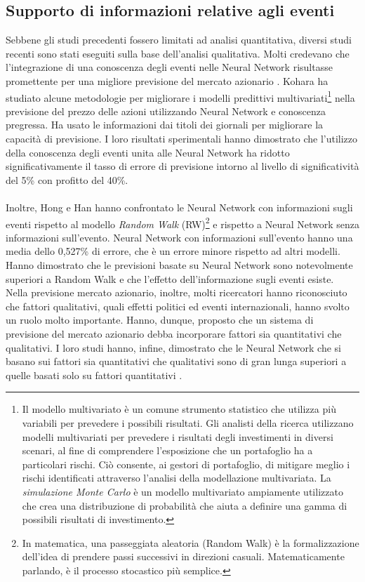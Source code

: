 \documentclass[a4paper,12pt]{report}
\begin{document}
\subsection{Supporto di informazioni relative agli eventi}
Sebbene gli studi precedenti fossero limitati ad analisi quantitativa, diversi studi recenti sono stati eseguiti sulla base dell'analisi qualitativa. Molti credevano che l'integrazione di una conoscenza degli eventi nelle Neural Network risultasse promettente per una migliore previsione del mercato azionario \cite{know-nn}\cite{news-nn}\cite{know-nn2}\cite{news-nn2}. Kohara \cite{know-nn2} ha studiato alcune metodologie per migliorare i modelli predittivi multivariati\footnote{Il modello multivariato è un comune strumento statistico che utilizza più variabili per prevedere i possibili risultati. Gli analisti della ricerca utilizzano modelli multivariati per prevedere i risultati degli investimenti in diversi scenari, al fine di comprendere l'esposizione che un portafoglio ha a particolari rischi. Ciò consente, ai gestori di portafoglio, di mitigare meglio i rischi identificati attraverso l'analisi della modellazione multivariata. La \textit{simulazione Monte Carlo} è un modello multivariato ampiamente utilizzato che crea una distribuzione di probabilità che aiuta a definire una gamma di possibili risultati di investimento.} nella previsione del prezzo delle azioni utilizzando Neural Network e conoscenza pregressa. Ha usato le informazioni dai titoli dei giornali per migliorare la capacità di previsione. I loro risultati sperimentali hanno dimostrato che l'utilizzo della conoscenza degli eventi unita alle Neural Network ha ridotto significativamente il tasso di errore di previsione intorno al livello di significatività del 5\% con profitto del 40\%.\\~\\
Inoltre, Hong e Han \cite{know-nn} hanno confrontato le Neural Network con informazioni sugli eventi rispetto al modello \textit{Random Walk} (RW)\footnote{In matematica, una passeggiata aleatoria (Random Walk) è la formalizzazione dell'idea di prendere passi successivi in direzioni casuali. Matematicamente parlando, è il processo stocastico più semplice.} e rispetto a Neural Network senza informazioni sull'evento. Neural Network con informazioni sull'evento hanno una media dello 0,527\% di errore, che è un errore minore rispetto ad altri modelli. Hanno dimostrato che le previsioni basate su Neural Network sono notevolmente superiori a Random Walk e che l'effetto dell'informazione sugli eventi esiste.\\
Nella previsione mercato azionario, inoltre, molti ricercatori hanno riconosciuto che fattori qualitativi, quali effetti politici ed eventi internazionali, hanno svolto un ruolo molto importante. Hanno, dunque, proposto che un sistema di previsione del mercato azionario debba incorporare fattori sia quantitativi che qualitativi. I loro studi hanno, infine, dimostrato che le Neural Network che si basano sui fattori sia quantitativi che qualitativi sono di gran lunga superiori a quelle basati solo su fattori quantitativi \cite{fuzzy-nn1}\cite{fuzzy-nn2}.
\end{document}

